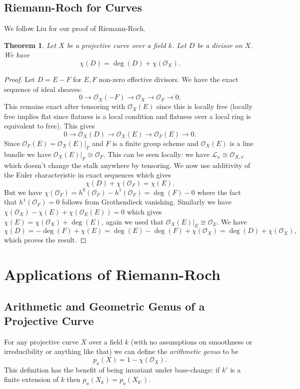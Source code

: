 \documentclass[12pt]{article}
\numberwithin{equation}{section}
\newtheorem{theorem}{Theorem}[subsection]
\theoremstyle{definition}
\theoremstyle{remark}
\newcommand{\Ocal}{\mathcal{O}}
\newcommand{\Lcal}{\mathcal{L}}
\begin{document}
\subsection{Riemann-Roch for Curves}
We follow Liu for our proof of Riemann-Roch. 

\begin{theorem}
	Let $X$ be a projective curve over a field $k$. 
	Let $D$ be a divisor on $X$. 
	We have 
	$$\chi(D) = \deg(D) + \chi(\Ocal_X).$$
\end{theorem}
\begin{proof}
	Let $D=E-F$ for $E,F$ non-zero effective divisors. 
	We have the exact sequence of ideal sheaves:
	$$ 0 \to \Ocal_X(-F) \to \Ocal_X \to \Ocal_F \to 0. $$
	This remains exact after tensoring with $\Ocal_X(E)$ since this is locally free (locally free implies flat since flatness is a local condition and flatness over a local ring is equivalent to free). 
	This gives 
	$$ 0 \to \Ocal_X(D) \to \Ocal_X(E) \to \Ocal_F(E) \to 0. $$
	Since $\Ocal_F(E) = \Ocal_X(E)\vert_F$ and $F$ is a finite group scheme and $\Ocal_X(E)$ is a line bundle we have $\Ocal_X(E)\vert_F \cong \Ocal_F$.
	This can be seen locally: we have $\Lcal_x \cong \Ocal_{X,x}$ which doesn't change the stalk anywhere by tensoring. 
	We now use additivity of the Euler characteristic in exact sequences which gives 
	$$ \chi(D) + \chi(\Ocal_F) = \chi(E).$$
	But we have $\chi(\Ocal_F) = h^0(\Ocal_F) - h^1(\Ocal_F)=\deg(F) -0$ where the fact that $h^1(\Ocal_F)=0$ follows from Grothendieck vanishing.
	Similarly we have $\chi(\Ocal_X)-\chi(E)+\chi(\Ocal_E(E))=0$ which gives $\chi(E) = \chi(\Ocal_X)+\deg(E)$, again we used that $\Ocal_X(E)\vert_E \cong \Ocal_E$.
	We have 
	$$\chi(D) = -\deg(F)+\chi(E) = \deg(E)-\deg(F) + \chi(\Ocal_X) = \deg(D) + \chi(\Ocal_X),$$
	which proves the result.
\end{proof}

\section{Applications of Riemann-Roch}


\subsection{Arithmetic and Geometric Genus of a Projective Curve}
For any projective curve $X$ over a field $k$ (with no assumptions on smoothness or irreducibility or anything like that) we can define the \emph{arithmetic genus} to be 
 $$p_a(X) = 1-\chi(\Ocal_X).$$
This definition has the benefit of being invariant under base-change: if $k'$ is a finite extension of $k$ then $p_a(X_k) = p_a(X_{k'})$.
\end{document}

